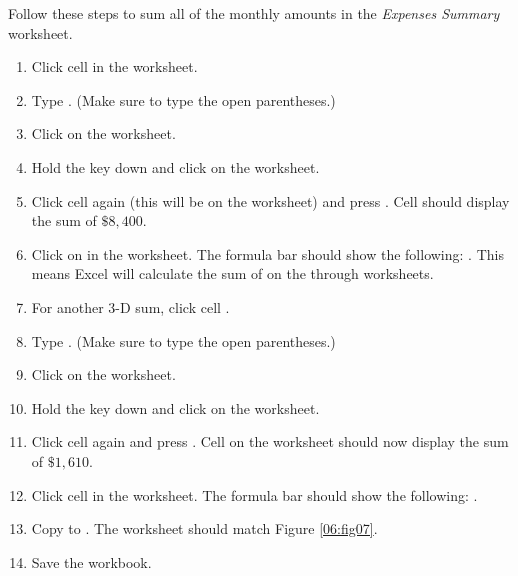 Follow these steps to sum all of the monthly amounts in the \textit{Expenses Summary} worksheet.

\begin{enumerate}
	\item Click cell  in the  worksheet.
	\item Type . (Make sure to type the open parentheses.)
	\item Click on the  worksheet.
	\item Hold the  key down and click on the  worksheet.
	\item Click cell  again (this will be on the  worksheet) and press . Cell  should display the sum of $ \$8,400 $.
	\item Click on  in the  worksheet. The formula bar should show the following: . This means Excel will calculate the sum of  on the  through  worksheets.
	\item For another $ 3 $-D sum, click cell .
	\item Type . (Make sure to type the open parentheses.)
	\item Click on the  worksheet.
	\item Hold the  key down and click on the  worksheet.
	\item Click cell  again and press . Cell  on the  worksheet should now display the sum of $ \$1,610 $.
	\item Click cell  in the  worksheet. The formula bar should show the following: .
	\item Copy  to . The  worksheet should match Figure \ref{06:fig07}.
	\item Save the workbook.
\end{enumerate}

